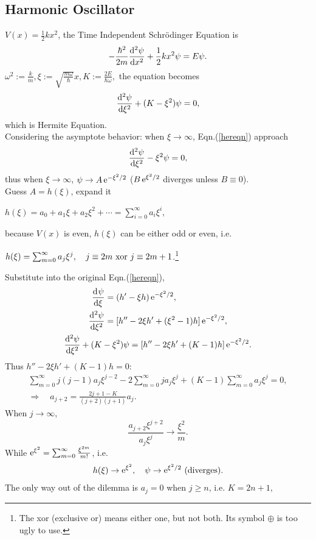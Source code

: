 \documentclass{article}
\newcommand{\su}[1]{\vspace{-#1 pt}}
\begin{document}
\subsection{Harmonic Oscillator}
$V(x)=\frac12kx^2$, the Time Independent Schrödinger Equation is
$$-\frac{\hbar^2}{2m}\dv[2]\psi{x}+\frac12kx^2\psi=E\psi.$$
$\omega^2:=\frac km,\xi:=\sqrt{\frac{m\omega}\hbar}x,K:=\frac{2E}{\hbar\omega},$ the equation becomes
\begin{align}\label{hereqn}
	\dv[2]\psi\xi+(K-\xi^2)\psi=0,
\end{align}
which is Hermite Equation.\\
Considering the asymptote behavior: when $\xi\to\infty$, Eqn.(\ref{hereqn}) approach
$$\dv[2]\psi\xi-\xi^2\psi=0,$$
thus when $\xi\to\infty$, $\psi\to A\e^{-\xi^2/2}$ ($B\e^{\xi^2/2}$ diverges unless $B\equiv 0$).\\
Guess $A=h(\xi)$, expand it
\begin{center}
	$h(\xi)=a_0+a_1\xi+a_2\xi^2+\cdots=\sum_{i=0}^\infty a_i\xi^i,$
\end{center}
because $V(x)$ is even, $h(\xi)$ can be either odd or even, i.e.
\begin{center}
	$h(\xi)=\sum_{m=0}^\infty a_j\xi^j,\quad j\equiv 2m~{\rm xor}~j\equiv 2m+1$.\footnote{The xor (exclusive or) means either one, but not both. Its symbol $\oplus$ is too ugly to use.}
\end{center}
Substitute into the original Eqn.(\ref{hereqn}),
\begin{gather*}
	\begin{aligned}
		\dv\psi\xi  & =(h'-\xi h)\e^{-\xi^2/2},            \\
		\dv[2]\psi\xi & =[h''-2\xi h'+(\xi^2-1)h]\e^{-\xi^2/2},
	\end{aligned}\\
	\dv[2]\psi\xi+(K-\xi^2)\psi=[h''-2\xi h'+(K-1)h]\e^{-\xi^2/2}.
\end{gather*}
Thus $h''-2\xi h'+(K-1)h=0$:
\begin{gather*}
	\sum_{m=0}^\infty j(j-1)a_j\xi^{j-2}-2\sum_{m=0}^\infty ja_j\xi^j+(K-1)\sum_{m=0}^\infty a_j\xi^j=0,\\
	\Rightarrow\quad a_{j+2}=\frac{2j+1-K}{(j+2)(j+1)}a_j.
\end{gather*}
When $j\to\infty$,
$$\frac{a_{j+2}\xi^{j+2}}{a_j\xi^j}\to\frac{\xi^2}m.$$
While $\e^{\xi^2}=\sum_{m=0}^\infty\frac{\xi^{2m}}{m!}$, i.e.\su{10}
$$h(\xi)\to \e^{\xi^2},\quad\psi\to \e^{\xi^2/2}~{\rm(diverges)}.$$
The only way out of the dilemma is $a_j=0$ when $j\geqslant n$, i.e. $K=2n+1,$
\end{document}
